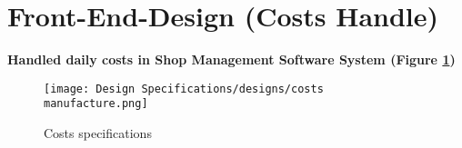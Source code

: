 \section{Front-End-Design (Costs Handle)}
\vspace{2cm}
\textbf{Handled daily costs in Shop Management Software System (Figure \ref{fig:fig 5.16})}\\

\begin{figure}[ht]
    \centering  
    \texttt{[image: Design Specifications/designs/costs manufacture.png]}    
    \caption{Costs specifications}
    \label{fig:fig 5.16}
\end{figure}